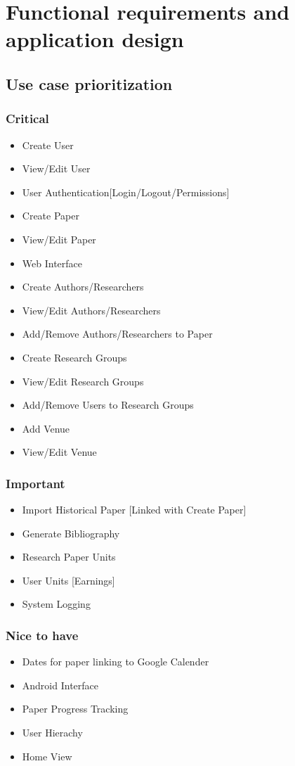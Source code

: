 \documentclass[a4paper,10pt]{article}
\begin{document}
\section{Functional requirements and application design}
\subsection{Use case prioritization}
\subsubsection{Critical}
	\begin{itemize}
	  	\item Create User
		\item View/Edit User
		\item User Authentication[Login/Logout/Permissions]
		\item Create Paper
		\item View/Edit Paper
		\item Web Interface
		\item Create Authors/Researchers
		\item View/Edit Authors/Researchers
		\item Add/Remove Authors/Researchers to Paper
		\item Create Research Groups
		\item View/Edit Research Groups
		\item Add/Remove Users to Research Groups
		\item Add Venue
		\item View/Edit Venue
	\end{itemize}

\subsubsection{Important}
	\begin{itemize}
	  	\item Import Historical Paper [Linked with Create Paper]
		\item Generate Bibliography
		\item Research Paper Units
		\item User Units [Earnings]
		\item System Logging 
	\end{itemize}


\subsubsection{Nice to have}
	\begin{itemize}
		\item Dates for paper linking to Google Calender
		\item Android Interface
		\item Paper Progress Tracking
		\item User Hierachy
		\item Home View
	\end{itemize}
\end{document}
